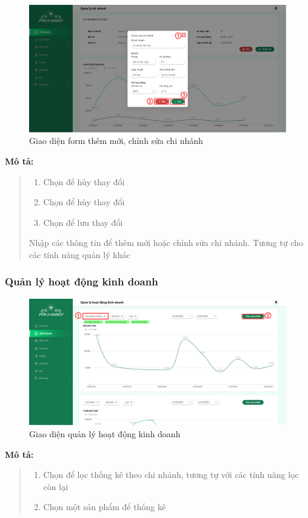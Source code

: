 \begin{figure}[!htp]
    \centering
    \includegraphics[width=12cm]{img/UI/admin_implement/branchEdit.png}
    \newline
    \caption{Giao diện form thêm mới, chỉnh sửa chi nhánh}
\end{figure}
\textbf{Mô tả:}
\begin{quote}
    \begin{enumerate}
        \item Chọn để hủy thay đổi
        \item Chọn để hủy thay đổi
        \item Chọn để lưu thay đổi
    \end{enumerate}
    Nhập các thông tin để thêm mới hoặc chỉnh sửa chi nhánh. Tương tự cho các tính năng quản lý khác
\end{quote}

\newpage

\subsubsection{Quản lý hoạt động kinh doanh}
\begin{figure}[!htp]
    \centering
    \includegraphics[width=12cm]{img/UI/admin_implement/statistic.png}
    \newline
    \caption{Giao diện quản lý hoạt động kinh doanh}
\end{figure}
\textbf{Mô tả:}
\begin{quote}
    \begin{enumerate}
        \item Chọn để lọc thống kê theo chi nhánh, tương tự với các tính năng lọc còn lại
        \item Chọn một sản phẩm để thống kê
    \end{enumerate}
\end{quote}


